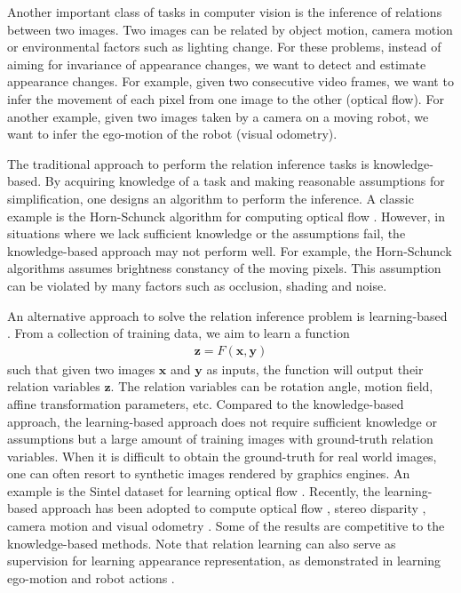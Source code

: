 \documentclass[conference]{IEEEtran}
\begin{document}
Another important class of tasks in computer vision is the inference of relations between two images. Two images can be related by object motion, camera motion or environmental factors such as lighting change. For these problems, instead of aiming for invariance of appearance changes, we want to detect and estimate appearance changes. For example, given two consecutive video frames, we want to infer the movement of each pixel from one image to the other (optical flow). For another example, given two images taken by a camera on a moving robot, we want to infer the ego-motion of the robot (visual odometry).

The traditional approach to perform the relation inference tasks is knowledge-based. 
By acquiring knowledge of a task and making reasonable assumptions for simplification, one designs an algorithm to perform the inference. A classic example is the Horn-Schunck algorithm for computing optical flow \cite{horn1981determining}. However, in situations where we lack sufficient knowledge or the assumptions fail, the knowledge-based approach may not perform well. For example, the Horn-Schunck algorithms assumes brightness constancy of the moving pixels. This assumption can be violated by many factors such as occlusion, shading and noise.

An alternative approach to solve the relation inference problem is learning-based \cite{memisevic2013learning}. From a collection of training data, we aim to learn a function
\begin{align}
\mathbf{z} = F(\mathbf{x},\mathbf{y})
\end{align}
such that given two images $\mathbf{x}$ and $\mathbf{y}$ as inputs, the function will output their relation variables $\mathbf{z}$. The relation variables can be rotation angle, motion field, affine transformation parameters, etc. Compared to the knowledge-based approach, the learning-based approach does not require sufficient knowledge or assumptions but a large amount of training images with ground-truth relation variables. 
When it is difficult to obtain the ground-truth for real world images, one can often resort to synthetic images rendered by graphics engines. An example is the Sintel dataset for learning optical flow  \cite{butler2012naturalistic}.
Recently, the learning-based approach has been adopted to compute optical flow \cite{fischer2015flownet,thewlis2016fully,ranjan2016optical,ilg2016flownet},
 stereo disparity \cite{luo2016efficient}, camera motion \cite{ummenhofer2016demon} and visual odometry \cite{konda2015learning}. 
Some of the results are competitive to the knowledge-based methods. 
Note that relation learning can also serve as supervision for learning appearance representation, as demonstrated in learning ego-motion \cite{agrawal2015learning,jayaraman2015learning} and robot actions \cite{pinto2016curious}.
\end{document}
